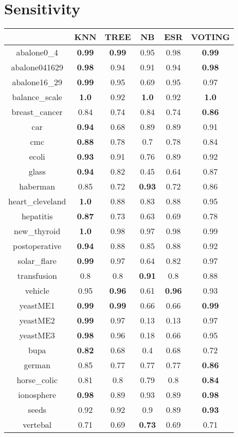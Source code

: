 \documentclass{article}%
\begin{document}
%
\normalsize%
\section*{Sensitivity}%
\begin{tabular}{c|ccccc}%
\hline%
&KNN&TREE&NB&ESR&VOTING\\%
\hline%
abalone0\_4&\textbf{0.99}&\textbf{0.99}&0.95&0.98&\textbf{0.99}\\%
\hline%
abalone041629&\textbf{0.98}&0.94&0.91&0.94&\textbf{0.98}\\%
\hline%
abalone16\_29&\textbf{0.99}&0.95&0.69&0.95&0.97\\%
\hline%
balance\_scale&\textbf{1.0}&0.92&\textbf{1.0}&0.92&\textbf{1.0}\\%
\hline%
breast\_cancer&0.84&0.74&0.84&0.74&\textbf{0.86}\\%
\hline%
car&\textbf{0.94}&0.68&0.89&0.89&0.91\\%
\hline%
cmc&\textbf{0.88}&0.78&0.7&0.78&0.84\\%
\hline%
ecoli&\textbf{0.93}&0.91&0.76&0.89&0.92\\%
\hline%
glass&\textbf{0.94}&0.82&0.45&0.64&0.87\\%
\hline%
haberman&0.85&0.72&\textbf{0.93}&0.72&0.86\\%
\hline%
heart\_cleveland&\textbf{1.0}&0.88&0.83&0.88&0.95\\%
\hline%
hepatitis&\textbf{0.87}&0.73&0.63&0.69&0.78\\%
\hline%
new\_thyroid&\textbf{1.0}&0.98&0.97&0.98&0.99\\%
\hline%
postoperative&\textbf{0.94}&0.88&0.85&0.88&0.92\\%
\hline%
solar\_flare&\textbf{0.99}&0.97&0.64&0.82&0.97\\%
\hline%
transfusion&0.8&0.8&\textbf{0.91}&0.8&0.88\\%
\hline%
vehicle&0.95&\textbf{0.96}&0.61&\textbf{0.96}&0.93\\%
\hline%
yeastME1&\textbf{0.99}&\textbf{0.99}&0.66&0.66&\textbf{0.99}\\%
\hline%
yeastME2&\textbf{0.99}&0.97&0.13&0.13&0.97\\%
\hline%
yeastME3&\textbf{0.98}&0.96&0.18&0.66&0.95\\%
\hline%
bupa&\textbf{0.82}&0.68&0.4&0.68&0.72\\%
\hline%
german&0.85&0.77&0.77&0.77&\textbf{0.86}\\%
\hline%
horse\_colic&0.81&0.8&0.79&0.8&\textbf{0.84}\\%
\hline%
ionosphere&\textbf{0.98}&0.89&0.93&0.89&\textbf{0.98}\\%
\hline%
seeds&0.92&0.92&0.9&0.89&\textbf{0.93}\\%
\hline%
vertebal&0.71&0.69&\textbf{0.73}&0.69&0.71\\%
\hline%
\end{tabular}
\end{document}
